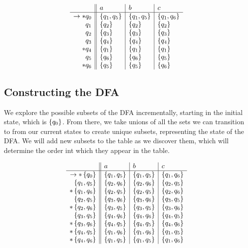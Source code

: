 \documentclass{article}
\begin{document}
        \begin{align*}
            \begin{array}{r || l | l | l}
                & a & b & c  \\ \hline
                \to *q_0 & \set{q_1, q_5} & \set{q_1, q_5} & \set{q_1, q_6} \\
                q_1 & \set{q_2}& \set{q_2}& \set{q_2} \\
                q_2 & \set{q_3}& \set{q_3}& \set{q_3} \\
                q_3 & \set{q_4}& \set{q_4}& \set{q_4} \\
                *q_4 & \set{q_1}& \set{q_1}& \set{q_1} \\
                q_5 & \set{q_6}& \set{q_6}& \set{q_5} \\
                *q_6 & \set{q_5}& \set{q_5}& \set{q_6} \\
            \end{array}
        \end{align*}

        \subsection*{Constructing the DFA}

        We explore the possible subsets of the DFA incrementally, starting in the initial state, which is $\set{q_0}$. From there, we take unions of all the sets we can transition to from our current states to create unique subsets, representing the state of the DFA. We will add new subsets to the table as we discover them, which will determine the order int which they appear in the table.

        \begin{align*}
            \begin{array}{r || l | l | l}
                & a & b & c \\ \hline
                \to *\set{q_0} & \set{q_1, q_5} & \set{q_1, q_5} & \set{q_1, q_6} \\
                \set{q_1, q_5} & \set{q_2, q_6} & \set{q_2,q_6} & \set{q_2, q_5} \\
                *\set{q_1, q_6} & \set{q_2, q_5} & \set{q_2,q_5} & \set{q_2, q_6} \\
                \set{q_2,q_5} & \set{q_3, q_6} & \set{q_3,q_6} & \set{q_3, q_5}  \\
                *\set{q_2,q_6} & \set{q_3, q_5} & \set{q_3,q_5} & \set{q_3, q_6}  \\
                \set{q_3,q_5} & \set{q_4, q_6} & \set{q_4,q_6} & \set{q_4, q_5}  \\
                *\set{q_3,q_6} & \set{q_4, q_5} & \set{q_4,q_5} & \set{q_4, q_6}  \\
                *\set{q_4,q_5} & \set{q_1, q_6} & \set{q_1,q_6} & \set{q_1, q_5}  \\
                *\set{q_4,q_6} & \set{q_1, q_5} & \set{q_1,q_5} & \set{q_1, q_6}
            \end{array}
        \end{align*}
\end{document}
